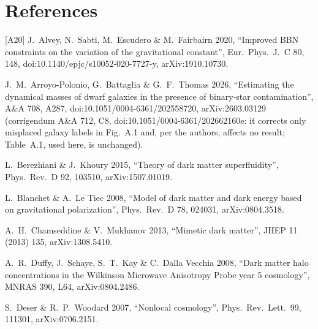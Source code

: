 \documentclass[10pt]{article}
\begin{document}
\section*{References}
\small
[A20] J.~Alvey, N.~Sabti, M.~Escudero \& M.~Fairbairn 2020, ``Improved BBN constraints on the variation of the gravitational constant'', Eur.\ Phys.\ J.\ C 80, 148, doi:10.1140/epjc/s10052-020-7727-y, arXiv:1910.10730.\par
[AP26] J.~M.~Arroyo-Polonio, G.~Battaglia \& G.~F.~Thomas 2026, ``Estimating the dynamical masses of dwarf galaxies in the presence of binary-star contamination'', A\&A 708, A287, doi:10.1051/0004-6361/202558720, arXiv:2603.03129 (corrigendum A\&A 712, C8, doi:10.1051/0004-6361/202662160e: it corrects only misplaced galaxy labels in Fig.~A.1 and, per the authors, affects no result; Table~A.1, used here, is unchanged).\par
[BK15] L.~Berezhiani \& J.~Khoury 2015, ``Theory of dark matter superfluidity'', Phys.\ Rev.\ D 92, 103510, arXiv:1507.01019.\par
[BL08] L.~Blanchet \& A.~Le Tiec 2008, ``Model of dark matter and dark energy based on gravitational polarization'', Phys.\ Rev.\ D 78, 024031, arXiv:0804.3518.\par
[CM13] A.~H.~Chamseddine \& V.~Mukhanov 2013, ``Mimetic dark matter'', JHEP 11 (2013) 135, arXiv:1308.5410.\par
[D08] A.~R.~Duffy, J.~Schaye, S.~T.~Kay \& C.~Dalla Vecchia 2008, ``Dark matter halo concentrations in the Wilkinson Microwave Anisotropy Probe year 5 cosmology'', MNRAS 390, L64, arXiv:0804.2486.\par
[DW07] S.~Deser \& R.~P.~Woodard 2007, ``Nonlocal cosmology'', Phys.\ Rev.\ Lett.\ 99, 111301, arXiv:0706.2151.\par
\end{document}
